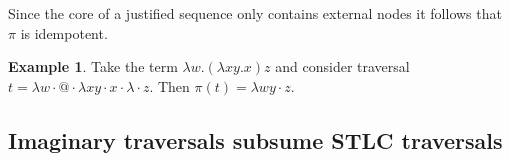 \documentclass{article}
\theoremstyle{definition}
\newtheorem{example}{Example}[section]
\def\coresymbol{\pi} %
\begin{document}
Since the core of a justified sequence only contains external nodes it follows that $\coresymbol$ is idempotent.

\begin{example}Take the term $\lambda w . (\lambda x y .x) z$ and consider traversal $t = \lambda w\cdot @ \cdot \lambda x y\cdot x\cdot\lambda \cdot z$.
    Then $\coresymbol(t) = \lambda wy \cdot z$.
\end{example}


\subsection{Imaginary traversals subsume STLC traversals}
\end{document}

